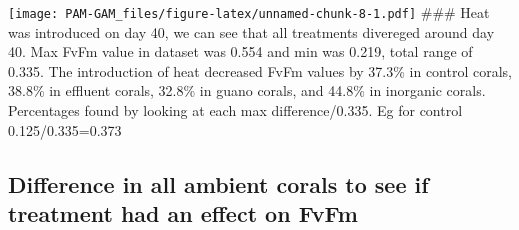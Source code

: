 \documentclass[
]{article}
\begin{document}
\texttt{[image: PAM-GAM\_files/figure-latex/unnamed-chunk-8-1.pdf]}
\#\#\# Heat was introduced on day 40, we can see that all treatments
divereged around day 40. Max FvFm value in dataset was 0.554 and min was
0.219, total range of 0.335. The introduction of heat decreased FvFm
values by 37.3\% in control corals, 38.8\% in effluent corals, 32.8\% in
guano corals, and 44.8\% in inorganic corals. Percentages found by
looking at each max difference/0.335. Eg for control 0.125/0.335=0.373

\hypertarget{difference-in-all-ambient-corals-to-see-if-treatment-had-an-effect-on-fvfm}{%
\subsection{Difference in all ambient corals to see if treatment had an
effect on
FvFm}\label{difference-in-all-ambient-corals-to-see-if-treatment-had-an-effect-on-fvfm}}
\end{document}
